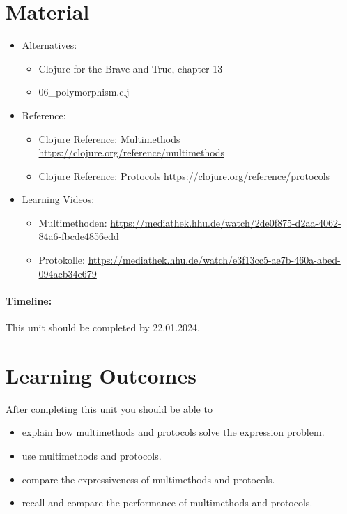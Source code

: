 \documentclass[11pt,a4paper]{article}
\begin{document}


\section{Material} 

\begin{itemize}
    \item Alternatives:
        \begin{itemize}
\item Clojure for the Brave and True, chapter 13
\item 06\_polymorphism.clj
        \end{itemize}
    \item Reference:
        \begin{itemize}
\item Clojure Reference: Multimethods \url{https://clojure.org/reference/multimethods}
\item Clojure Reference: Protocols \url{https://clojure.org/reference/protocols}
        \end{itemize}
    \item Learning Videos:
        \begin{itemize}
            \item Multimethoden: \url{https://mediathek.hhu.de/watch/2de0f875-d2aa-4062-84a6-fbcde4856edd}
            \item Protokolle: \url{https://mediathek.hhu.de/watch/e3f13cc5-ae7b-460a-abed-094acb34e679}
        \end{itemize}
\end{itemize}

\paragraph{Timeline:} This unit should be completed by 22.01.2024.


\section{Learning Outcomes}

After completing this unit you should be able to

\begin{itemize}
    \item explain how multimethods and protocols solve the expression problem.
    \item use multimethods and protocols.
    \item compare the expressiveness of multimethods and protocols.
    \item recall and compare the performance of multimethods and protocols.
\end{itemize}
\end{document}
